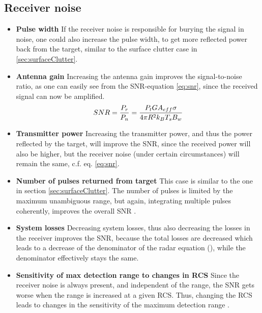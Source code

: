 \subsection{Receiver noise}

\begin{itemize}
	\item \textbf{Pulse width}\newline
		If the receiver noise is responsible for burying the signal in noise, one could also increase the pulse width, to get more reflected power back from the target, similar to the surface clutter case in \ref{sec:surfaceClutter}.
	\item \textbf{Antenna gain} \newline
				Increasing the antenna gain improves the signal-to-noise ratio, as one can easily see from the SNR-equation \ref{eq:snr}, since the received signal can now be amplified.
		\begin{equation}
			\label{eq:snr}
			\centering
			SNR = \frac{P_r}{P_n} = \frac{P_t G A_{eff} \sigma}{4 \pi R^2 k_B T_s B_w}
		\end{equation}
	\item \textbf{Transmitter power}\newline
		Increasing the transmitter power, and thus the power reflected by the target, will improve the SNR, since the received power will also be higher, but the receiver noise (under certain circumstances) will remain the same, c.f. eq. \ref{eq:snr}.
	\item \textbf{Number of pulses returned from target}\newline
		This case is similar to the one in section \ref{sec:surfaceClutter}. The number of pulses is limited by the maximum unambiguous range, but again, integrating multiple pulses coherently, improves the overall SNR \citep{richards2010principles}.
	\item \textbf{System losses}\newline
		Decreasing system losses, thus also decreasing the losses in the receiver improves the SNR, because the total losses are decreased which leads to a decrease of the denominator of the radar equation (\citep[c.f.][Eq. 2.17]{richards2010principles}), while the denominator effectively stays the same.
	\item \textbf{Sensitivity of max detection range to changes in RCS}
		Since the receiver noise is always present, and independent of the range, the SNR gets worse when the range is increased at a given RCS. Thus, changing the RCS leads to changes in the sensitivity of the maximum detection range \citep{richards2010principles}.
\end{itemize}

